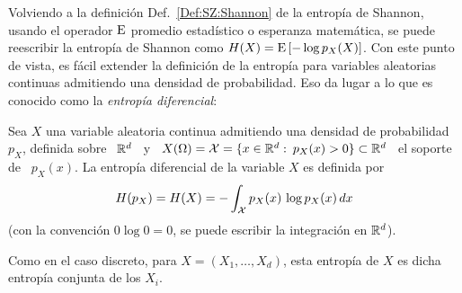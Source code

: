 
\label{Ssec:SZ:Diferencial}

Volviendo  a  la  definici\'on  Def.~\ref{Def:SZ:Shannon} de  la  entrop\'ia  de
Shannon,  usando   el  operador   $\operatorname{E}$  promedio  estad\'istico   o  esperanza
matem\'atica,  se  puede  reescribir  la  entrop\'ia de  Shannon  como  $H(X)  =
\operatorname{E}\left[ - \log p_X(X) \right]$.  Con este punto de vista, es f\'acil extender
la definici\'on de la  entrop\'ia para variables aleatorias continuas admitiendo
una densidad de  probabilidad.  Eso da lugar  a lo que es conocido  como la {\it
  entrop\'ia diferencial}:

\begin{definicion}
\label{Def:SZ:EntropiaDiferencial}
%
  Sea  $X$   una  variable  aleatoria   continua  admitiendo  una   densidad  de
  probabilidad \ $p_X$, definida sobre \ $\mathbb{R}^d$  \ y \ $X(\Omega) = \mathcal{X} = \{ x
  \in  \mathbb{R}^d:  \:  p_X(x)  >  0  \}  \subset \mathbb{R}^d$  \  el  soporte  de  \
  $p_X(x)$. La entrop\'ia diferencial de la variable $X$ es definida por
  \[
  H(p_X) = H(X) = - \int_{\mathcal{X}} p_X(x) \, \log p_X(x) \, dx
  \]
  (con la  convenci\'on $0 \log  0 = 0$,  se puede escribir la  integraci\'on en
  $\mathbb{R}^d$).
\end{definicion}
%
Como en el caso discreto, para $X = (X_1,\ldots,X_d)$, esta entrop\'ia de $X$ es
dicha entrop\'ia conjunta de los $X_i$.

